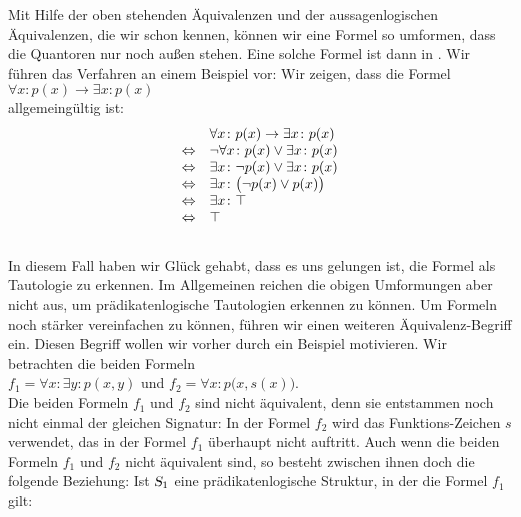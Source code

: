 Mit Hilfe der oben stehenden Äquivalenzen und der aussagenlogischen Äquivalenzen, die wir schon kennen, können
wir eine Formel so umformen, dass die Quantoren nur noch außen stehen.  Eine solche Formel ist dann in
.  Wir führen das Verfahren an einem Beispiel vor: Wir zeigen, dass die Formel 
\\[0.2cm]
\hspace*{1.3cm}
$\forall x\colon p(x) \rightarrow \exists x\colon p(x)$ 
\\[0.2cm]
allgemeingültig ist: 
$$ 
\begin{array}{ll}
                 & \forall x\colon p(x) \rightarrow \exists x\colon p(x)  \\
 \Leftrightarrow & \neg \forall x\colon p(x) \vee \exists x\colon p(x)    \\
 \Leftrightarrow & \exists x\colon \neg p(x) \vee \exists x\colon p(x)    \\
 \Leftrightarrow & \exists x\colon \bigl(\neg p(x) \vee p(x)\bigr) \\
 \Leftrightarrow & \exists x\colon \top                                                  \\
 \Leftrightarrow & \top                                                  \\
\end{array}
$$
\\[0.2cm]
In diesem Fall haben wir Glück gehabt, dass es uns gelungen ist, die Formel als Tautologie zu
erkennen.  Im Allgemeinen reichen die obigen Umformungen aber nicht aus, um prädikatenlogische
Tautologien erkennen zu können.  Um Formeln noch stärker vereinfachen zu können, 
führen wir einen weiteren Äquivalenz-Begriff ein.  Diesen Begriff wollen wir vorher durch ein Beispiel
motivieren.  Wir betrachten die beiden Formeln 
\\[0.2cm]
\hspace*{1.3cm} $f_1 = \forall x \colon \exists y \colon p(x,y)$ \quad und \quad $f_2 = \forall x \colon
p\bigl(x,s(x)\bigr)$.
\\[0.2cm]
Die beiden Formeln $f_1$ und $f_2$ sind nicht äquivalent, denn sie entstammen noch nicht
einmal der gleichen Signatur: In der Formel $f_2$ wird das Funktions-Zeichen $s$
verwendet, das in der Formel $f_1$ überhaupt nicht auftritt. 
Auch wenn die beiden Formeln $f_1$ und $f_2$ nicht äquivalent sind, so besteht zwischen
ihnen doch die folgende Beziehung:  Ist $\textsl{S}_1$ eine
prädikatenlogische Struktur, in der die Formel $f_1$ gilt:
\\[0.2cm]
